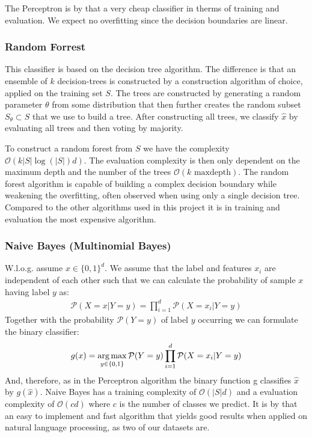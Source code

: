 \documentclass[11pt]{article}
\begin{document}
The Perceptron is by that a very cheap classifier in therms of training and evaluation. We expect no overfitting since the decision boundaries are linear.

\subsubsection{Random Forrest}\cite{shalev2014}
This classifier is based on the decision tree algorithm. The difference is that an ensemble of $k$ decision-trees is constructed by a construction algorithm of choice, applied on the training set $S$. The trees are constructed by generating a random parameter $\theta$ from some distribution that then further creates the random subset $S_{\theta}\subset S$ that we use to build a tree. After constructing all trees, we classify $\hat{x}$ by evaluating all trees and then voting by majority.

To construct a random forest from $S$ we have the complexity \cite{tsang2005} $\mathcal{O}(k|S|\log(|S|)d)$. The evaluation complexity is then only dependent on the maximum depth and the number of the trees \cite{tsang2005} $\mathcal{O}(k\text{ maxdepth})$.
The random forest algorithm is capable of building a complex decision boundary while weakening the overfitting, often observed when using only a single decision tree. Compared to the other algorithms used in this project it is in training and evaluation the most expensive algorithm.

\subsubsection{Naive Bayes (Multinomial Bayes)}\cite{shalev2014}
W.l.o.g. assume $x\in \{0,1\}^d$. We assume that the label and features $x_i$ are independent of each other such that we can calculate the probability of sample $x$ having label $y$ as:
\begin{align}
\mathcal{P}(X=x|Y=y) = \prod\limits_{i=1}^d\mathcal{P}(X=x_i|Y=y)
\end{align}
Together with the probability $\mathcal{P}(Y=y)$ of label $y$ occurring we can formulate the binary classifier:
\begin{align}
g(x) = \operatorname*{arg\,max}\limits_{y\in\{0,1\}}\mathcal{P}(Y=y)\prod\limits_{i=1}^d\mathcal{P}(X=x_i|Y=y)
\end{align}
And, therefore, as in the Perceptron algorithm the binary function g classifies $\hat{x}$ by $g(\hat{x})$.
Naive Bayes has a training complexity of $\mathcal{O}(|S|d)$ and a evaluation complexity of $\mathcal{O}(cd)$ where $c$ is the number of classes we predict. It is by that an easy to implement and fast algorithm that yields good results when applied on natural language processing, as two of our datasets are.
\end{document}
